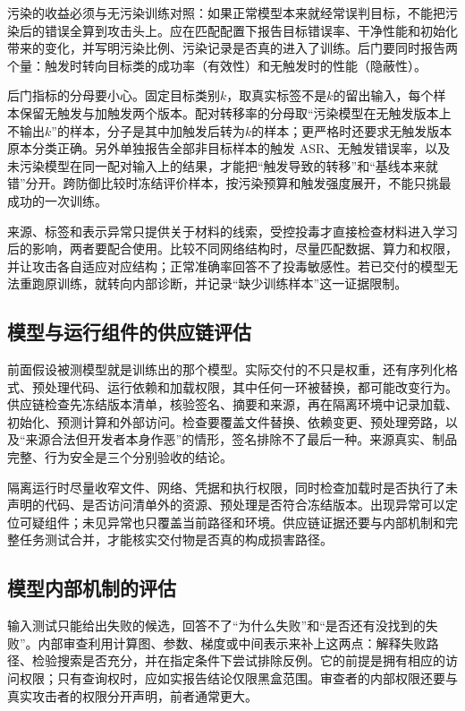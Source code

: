 污染的收益必须与无污染训练对照：如果正常模型本来就经常误判目标，不能把污染后的错误全算到攻击头上。应在匹配配置下报告目标错误率、干净性能和初始化带来的变化，并写明污染比例、污染记录是否真的进入了训练。后门要同时报告两个量：触发时转向目标类的成功率（有效性）和无触发时的性能（隐蔽性）。

后门指标的分母要小心。固定目标类别$k$，取真实标签不是$k$的留出输入，每个样本保留无触发与加触发两个版本。配对转移率的分母取“污染模型在无触发版本上不输出$k$”的样本，分子是其中加触发后转为$k$的样本；更严格时还要求无触发版本原本分类正确。另外单独报告全部非目标样本的触发 ASR、无触发错误率，以及未污染模型在同一配对输入上的结果，才能把“触发导致的转移”和“基线本来就错”分开。跨防御比较时冻结评价样本，按污染预算和触发强度展开，不能只挑最成功的一次训练。

来源、标签和表示异常只提供关于材料的线索，受控投毒才直接检查材料进入学习后的影响，两者要配合使用。比较不同网络结构时，尽量匹配数据、算力和权限，并让攻击各自适应对应结构；正常准确率回答不了投毒敏感性。若已交付的模型无法重跑原训练，就转向内部诊断，并记录“缺少训练样本”这一证据限制。

\subsection{模型与运行组件的供应链评估}
\label{sec:security-supply-chain-test}

前面假设被测模型就是训练出的那个模型。实际交付的不只是权重，还有序列化格式、预处理代码、运行依赖和加载权限，其中任何一环被替换，都可能改变行为。供应链检查先冻结版本清单，核验签名、摘要和来源，再在隔离环境中记录加载、初始化、预测计算和外部访问。检查要覆盖文件替换、依赖变更、预处理旁路，以及“来源合法但开发者本身作恶”的情形，签名排除不了最后一种。来源真实、制品完整、行为安全是三个分别验收的结论。

隔离运行时尽量收窄文件、网络、凭据和执行权限，同时检查加载时是否执行了未声明的代码、是否访问清单外的资源、预处理是否符合冻结版本。出现异常可以定位可疑组件；未见异常也只覆盖当前路径和环境。供应链证据还要与内部机制和完整任务测试合并，才能核实交付物是否真的构成损害路径。

\subsection{模型内部机制的评估}
\label{sec:security-model-test}

输入测试只能给出失败的候选，回答不了“为什么失败”和“是否还有没找到的失败”。内部审查利用计算图、参数、梯度或中间表示来补上这两点：解释失败路径、检验搜索是否充分，并在指定条件下尝试排除反例。它的前提是拥有相应的访问权限；只有查询权时，应如实报告结论仅限黑盒范围。审查者的内部权限还要与真实攻击者的权限分开声明，前者通常更大。

